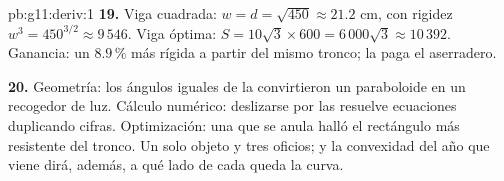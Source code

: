 \begin{solution}{pb:g11:deriv:1}
\textbf{19.} Viga cuadrada: $w = d = \sqrt{450} \approx 21.2$ cm, con
rigidez $w^3 = 450^{3/2} \approx 9\,546$. Viga óptima:
$S = 10\sqrt3 \times 600 = 6\,000\sqrt3 \approx 10\,392$. Ganancia: un
$8.9\,\%$ más rígida a partir del mismo tronco; la  paga el
aserradero.

\textbf{20.} Geometría: los ángulos iguales de la  convirtieron un
paraboloide en un recogedor de luz. Cálculo numérico: deslizarse por las
 resuelve ecuaciones duplicando cifras. Optimización: una
 que se anula halló el rectángulo más resistente del tronco. Un
solo objeto y tres oficios; y la convexidad del año que viene dirá,
además, a qué lado de cada  queda la curva.
\end{solution}
